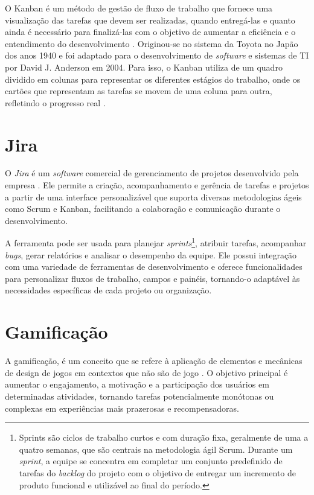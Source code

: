 O Kanban é um método de gestão de fluxo de trabalho que fornece uma visualização 
das tarefas que devem ser realizadas, quando entregá-las e quanto ainda é necessário 
para finalizá-las com o objetivo de aumentar a eficiência e o entendimento do 
desenvolvimento \cite{ohno1988toyota}. Originou-se no sistema da Toyota no Japão 
dos anos 1940 e foi adaptado para o desenvolvimento de \textit{software} e sistemas de 
TI por David J. Anderson em 2004. Para isso, o Kanban utiliza de um quadro dividido em 
colunas para representar os diferentes estágios do trabalho, onde os cartões que 
representam as tarefas se movem de uma coluna para outra, refletindo o progresso real 
\cite{zayat2020framework}.

\section{Jira}

O \textit{Jira} é um \textit{software} comercial de gerenciamento de projetos desenvolvido pela empresa . Ele permite a criação, acompanhamento e gerência de tarefas e projetos a partir de uma interface personalizável que suporta diversas metodologias ágeis como Scrum \cite{sutherland2020scrum} e Kanban, facilitando a colaboração e comunicação durante o desenvolvimento.

A ferramenta pode ser usada para planejar \textit{sprints}\footnote{Sprints são ciclos de trabalho curtos e com duração fixa, geralmente de uma a quatro semanas, que são centrais na metodologia ágil Scrum. Durante um \textit{sprint}, a equipe se concentra em completar um conjunto predefinido de tarefas do \textit{backlog} do projeto com o objetivo de entregar um incremento de produto funcional e utilizável ao final do período.}, atribuir tarefas, acompanhar \textit{bugs}, gerar relatórios e analisar o desempenho da equipe. Ele possui integração com uma variedade de ferramentas de desenvolvimento e oferece funcionalidades para personalizar fluxos de trabalho, campos e painéis, tornando-o adaptável às necessidades específicas de cada projeto ou organização.

\section{Gamificação}

A gamificação, é um conceito que se refere à aplicação de elementos e mecânicas de design de jogos em contextos que não são de jogo \cite{deterding2011gamefulness}. O objetivo principal é aumentar o engajamento, a motivação e a participação dos usuários em determinadas atividades, tornando tarefas potencialmente monótonas ou complexas em experiências mais prazerosas e recompensadoras.

